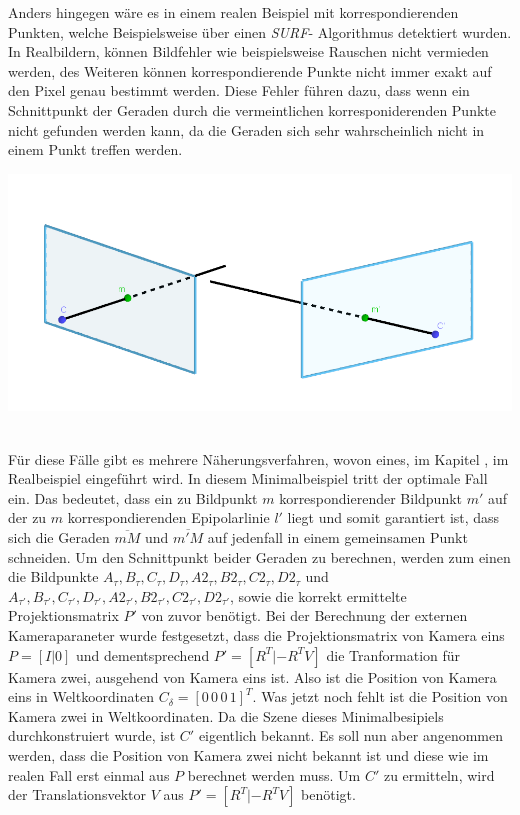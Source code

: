  Anders hingegen wäre es in einem realen Beispiel mit korrespondierenden Punkten, welche Beispielsweise über einen \textit{SURF}- Algorithmus detektiert wurden\cite{Mandun}. In Realbildern, können Bildfehler wie beispielsweise Rauschen nicht vermieden werden, des Weiteren können korrespondierende Punkte nicht immer exakt auf den Pixel genau bestimmt werden. Diese Fehler führen dazu, dass wenn ein Schnittpunkt der Geraden durch die vermeintlichen korresponiderenden Punkte nicht gefunden werden kann, da die Geraden sich sehr wahrscheinlich nicht in einem Punkt treffen werden\cite{Mandun,HZ}. 


\begin{minipage}{\linewidth}
	\centering
	\includegraphics[width=0.8\linewidth]{images/problemTriangulation.png}
\end{minipage}\\ 

Für diese Fälle gibt es mehrere Näherungsverfahren, wovon eines, im Kapitel , im Realbeispiel eingeführt wird\cite{HZ}. In diesem Minimalbeispiel tritt der optimale Fall ein. Das bedeutet, dass ein zu Bildpunkt $m$ korrespondierender Bildpunkt $m'$ auf der zu $m$ korrespondierenden Epipolarlinie $l'$ liegt und somit garantiert ist, dass sich die Geraden $\overline{mM}$ und $\overline{m'M}$ auf jedenfall in einem gemeinsamen Punkt schneiden. Um den Schnittpunkt beider Geraden zu berechnen, werden zum einen die Bildpunkte  $A_\tau,B_\tau,C_\tau,D_\tau,A2_\tau,B2_\tau,C2_\tau,D2_\tau$ und $A_{\tau'},B_{\tau'},C_{\tau'},D_{\tau'},A2_{\tau'},B2_{\tau'},C2_{\tau'},D2_{\tau'}$, sowie die korrekt ermittelte Projektionsmatrix $P'$ von zuvor benötigt. Bei der Berechnung der externen Kameraparaneter wurde festgesetzt, dass die Projektionsmatrix von Kamera eins $P = [I|0]$ und dementsprechend $P' = [R^T|-R^TV]$ die Tranformation für Kamera zwei, ausgehend von Kamera eins ist. Also ist die Position von Kamera eins in Weltkoordinaten $C_\delta = [0 \, 0 \, 0 \, 1]^T$. Was jetzt noch fehlt ist die Position von Kamera zwei in Weltkoordinaten. Da die Szene dieses Minimalbesipiels durchkonstruiert wurde, ist $C'$ eigentlich bekannt. Es soll nun aber angenommen werden, dass die Position von Kamera zwei nicht bekannt ist und diese wie im realen Fall erst einmal aus $P$ berechnet werden muss. Um $C'$ zu ermitteln, wird der Translationsvektor $V$ aus  $P' = [R^T|-R^TV]$ benötigt. 

